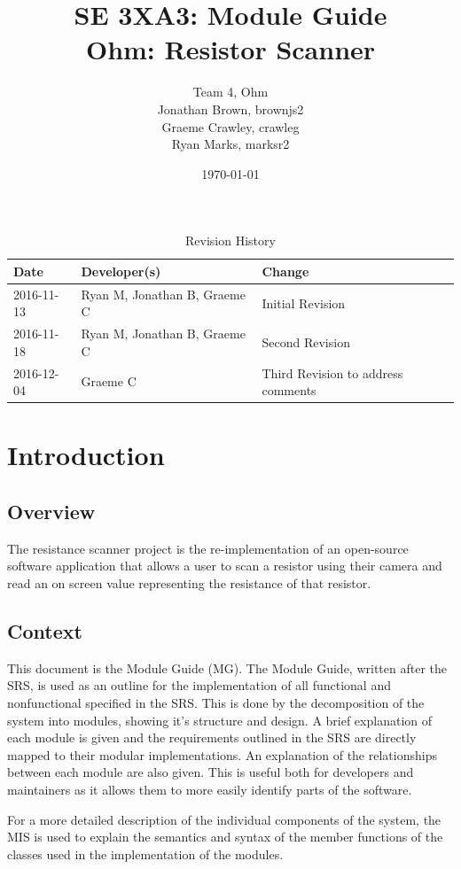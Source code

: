\documentclass[12pt, titlepage]{article}
\title{SE 3XA3: Module Guide\\ Ohm: Resistor Scanner}
\author{Team 4, Ohm
		\\ Jonathan Brown, brownjs2
		\\ Graeme Crawley, crawleg
		\\ Ryan Marks, marksr2
}
\date{\today}
\begin{document}
\begin{table}[hp]
\caption{Revision History} \label{TblRevisionHistory}
\begin{tabularx}{\textwidth}{llX}
\toprule
\textbf{Date} & \textbf{Developer(s)} & \textbf{Change}\\
\midrule
2016-11-13 & Ryan M, Jonathan B, Graeme C & Initial Revision\\
2016-11-18 & Ryan M, Jonathan B, Graeme C & Second Revision\\
2016-12-04 & Graeme C & Third Revision to address comments\\
\bottomrule
\end{tabularx}
\end{table}


\newpage
\maketitle
{}
\tableofcontents
\listoftables
\listoffigures



\newpage


\section{Introduction}
\subsection{Overview}
The resistance scanner project is the re-implementation of an open-source software application that allows a user to scan a resistor using their camera and read an on screen value representing the resistance of that resistor.

\subsection{Context}
\par This document is the Module Guide (MG). The Module Guide, written after the SRS, is used as an outline for the implementation of all functional and nonfunctional specified in the SRS. This is done by the decomposition of the system into modules, showing it's structure and design. A brief explanation of each module is given and the requirements outlined in the SRS are directly mapped to their modular implementations. An explanation of the relationships between each module are also given. This is useful both for developers and maintainers as it allows them to more easily identify parts of the software.
\par For a more detailed description of the individual components of the system, the MIS is used to explain the semantics and syntax of the member functions of the classes used in the implementation of the modules.
\end{document}
